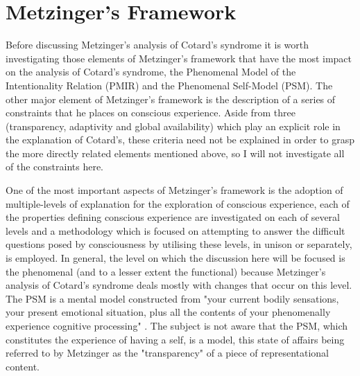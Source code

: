 \chapter{Metzinger's Framework}
\label{chap:framework}

Before discussing Metzinger's analysis of Cotard's syndrome it is worth investigating those elements of Metzinger's framework that have the most impact on the analysis of Cotard's syndrome, the Phenomenal Model of the Intentionality Relation (PMIR) and the Phenomenal Self-Model (PSM). The other major element of Metzinger's framework is the description of a series of constraints that he places on conscious experience. Aside from three (transparency, adaptivity and global availability) which play an explicit role in the explanation of Cotard's, these criteria need not be explained in order to grasp the more directly related elements mentioned above, so I will not investigate all of the constraints here.

One of the most important aspects of Metzinger's framework is the adoption of multiple-levels of explanation for the exploration of conscious experience, each of the properties defining conscious experience are investigated on each of several levels and a methodology which is focused on attempting to answer the difficult questions posed by consciousness by utilising these levels, in unison or separately, is employed. In general, the level on which the discussion here will be focused is the phenomenal (and to a lesser extent the functional) because Metzinger's analysis of Cotard's syndrome deals mostly with changes that occur on this level.
The PSM is a mental model constructed from "your current bodily sensations, your present emotional situation, plus all the contents of your phenomenally experience cognitive processing" \cite[p. 299]{metzinger2003}. The subject is not aware that the PSM, which constitutes the experience of having a self, is a model, this state of affairs being referred to by Metzinger as the "transparency" of a piece of representational content.

